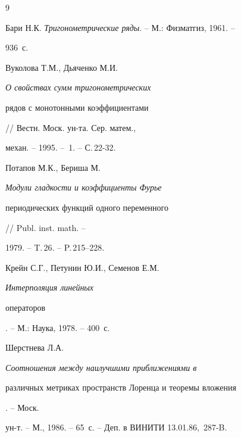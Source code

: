 \begin{thebibliography}{9}







Бари Н.К. {\em Тригонометрические ряды}. -- М.: Физматгиз, 1961. --


936~с.




Вуколова Т.М., Дьяченко М.И. {\em О свойствах сумм тригонометрических


рядов с монотонными коэффициентами} // Вестн. Моск. ун-та. Сер. матем.,


механ. -- 1995. -- \No\,1. -- С.\,22-32.




Потапов М.К., Бериша М. {\em Модули гладкости и коэффициенты Фурье


периодических функций одного переменного} // Publ. inst. math. --


1979. -- T.\,26. -- P.\,215--228.




Крейн С.Г., Петунин Ю.И., Семенов Е.М. {\em Интерполяция линейных


операторов}. -- М.: Наука, 1978. -- 400~с.




Шерстнева Л.А. {\em Соотношения между наилучшими приближениями в


различных метриках пространств Лоренца и теоремы вложения}. -- Моск.


ун-т. -- М., 1986. -- 65~с. -- Деп. в ВИНИТИ 13.01.86, \No\,287-B.








\end{thebibliography}





\vskip 2cm












\label{end}








